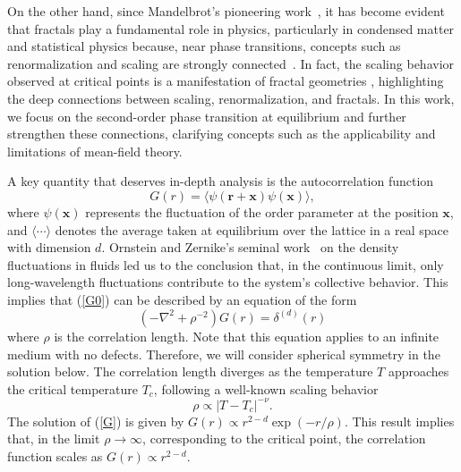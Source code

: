 \documentclass[pre,aps,twocolumn,showpacs,floatfix,nofootinbib,superscriptaddress,linenumbers]{revtex4-1}
\renewcommand{\vec}{\mathbf}
\begin{document}
On the other hand, since Mandelbrot's pioneering work~\cite{Mandelbrot82}, it has become evident that fractals play a fundamental role in physics, particularly in condensed matter and statistical physics because, near phase transitions, concepts such as renormalization and scaling are strongly connected~\cite{Cardy96}. In fact, the scaling behavior observed at critical points is a manifestation of fractal geometries \cite{Suzuki8, Kroger00,Devakul19}, highlighting the deep connections between scaling, renormalization, and fractals. In this work,  we focus on the second-order phase transition at equilibrium and further strengthen these connections, clarifying concepts such as the applicability and limitations of mean-field theory. 

A key quantity that deserves in-depth analysis is the autocorrelation function
\begin{equation}
\label{G0}
    G(r)=\langle \psi(\vec{r}+\vec{x})\psi(\vec{x})\rangle,
\end{equation}
where $\psi(\vec{x})$ represents the fluctuation of the order parameter at the position $\vec{x}$, and $\langle \cdots\rangle$ denotes the average taken at equilibrium over the lattice in a real space with dimension $d$. Ornstein and Zernike's seminal work~\cite{Ornstein14} on the density fluctuations in fluids led us to the conclusion that, in the continuous limit, only long-wavelength fluctuations contribute to the system's collective behavior. This implies that (\ref{G0}) can be described by an equation of the form ~\cite{Kardar07} 
\begin{equation}
\label{G}
 (-\nabla^2 +\rho^{-2})G(r)=\delta^{(d)}(r)   
\end{equation} 
where $\rho$ is the correlation length. Note that this equation applies to an infinite medium with no defects. Therefore, we will consider spherical symmetry in the solution below. The correlation length diverges as the temperature $T$ approaches the critical temperature $T_c$, following a well-known scaling behavior~\cite{Kardar07,Cardy96}
\begin{equation}
\label{rhodivergence}
\rho \propto |T-T_c|^{-\nu}.
\end{equation}
The solution of (\ref{G}) is given by $G(r)\propto r^{2-d} \exp(-r/\rho)$. This result implies that, in the limit $\rho \rightarrow \infty $, corresponding to the critical point, the correlation function scales as $G(r) \propto r^{2-d} $.
\end{document}
